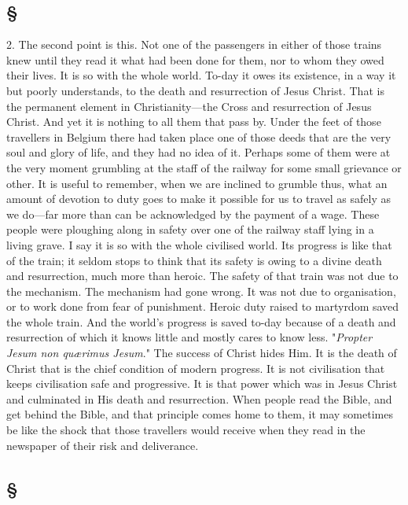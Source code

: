 \documentclass[draft]{ptfdoc}
\begin{document}
\subsection*{ \S } 

2. The second point is this. Not one of the 
passengers in either of those trains knew until 
they read it what had been done for them, nor 
to whom they owed their lives. It is so with 
the whole world. To-day it owes its existence, 
in a way it but poorly understands, to the 
death and resurrection of Jesus Christ. That 
is the permanent element in Christianity---the 
Cross and resurrection of Jesus Christ. And 
yet it is nothing to all them that pass by. 
Under the feet of those travellers in Belgium 
there had taken place one of those deeds that 
are the very soul and glory of life, and they had 
no idea of it. Perhaps some of them were at 
the very moment grumbling at the staff of the 
railway for some small grievance or other. It 
is useful to remember, when we are inclined to 
grumble thus, what an amount of devotion to 
duty goes to make it possible for us to travel as 
safely as we do---far more than can be acknowledged 
by the payment of a wage. These 
people were ploughing along in safety over one 
of the railway staff lying in a living grave. I 
say it is so with the whole civilised world. Its 
progress is like that of the train; it seldom 
stops to think that its safety is owing to a 
divine death and resurrection, much more than 
heroic. The safety of that train was not due 
to the mechanism. The mechanism had gone 
wrong. It was not due to organisation, or to 
work done from fear of punishment. Heroic 
duty raised to martyrdom saved the whole 
train. And the world's progress is saved to-day 
because of a death and resurrection of which
it knows little and mostly cares to know less. 
"\textit{Propter Jesum non qu{\ae}rimus Jesum}." The 
success of Christ hides Him. It is the death 
of Christ that is the chief condition of modern 
progress. It is not civilisation that keeps 
civilisation safe and progressive. It is that 
power which was in Jesus Christ and culminated 
in His death and resurrection. When 
people read the Bible, and get behind the 
Bible, and that principle comes home to them, 
it may sometimes be like the shock that those 
travellers would receive when they read in the 
newspaper of their risk and deliverance. 

\subsection*{ \S }
\end{document}
